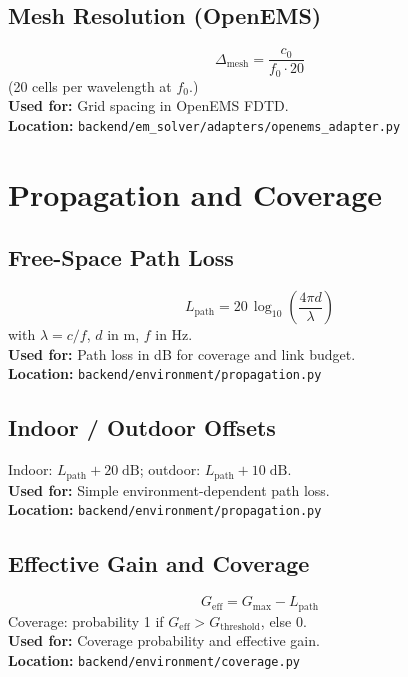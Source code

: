 \documentclass[11pt,a4paper]{article}
\begin{document}
\subsection{Mesh Resolution (OpenEMS)}
\begin{equation}
\Delta_{\mathrm{mesh}} = \frac{c_0}{f_0 \cdot 20}
\end{equation}
(20 cells per wavelength at \(f_0\).) \\
\textbf{Used for:} Grid spacing in OpenEMS FDTD. \\
\textbf{Location:} \texttt{backend/em\_solver/adapters/openems\_adapter.py}

\section{Propagation and Coverage}

\subsection{Free-Space Path Loss}
\begin{equation}
L_{\mathrm{path}} = 20\,\log_{10}\left(\frac{4\pi d}{\lambda}\right)
\end{equation}
with \(\lambda = c / f\), \(d\) in m, \(f\) in Hz. \\
\textbf{Used for:} Path loss in dB for coverage and link budget. \\
\textbf{Location:} \texttt{backend/environment/propagation.py}

\subsection{Indoor / Outdoor Offsets}
Indoor: \(L_{\mathrm{path}} + 20\;\mathrm{dB}\); outdoor: \(L_{\mathrm{path}} + 10\;\mathrm{dB}\). \\
\textbf{Used for:} Simple environment-dependent path loss. \\
\textbf{Location:} \texttt{backend/environment/propagation.py}

\subsection{Effective Gain and Coverage}
\begin{equation}
G_{\mathrm{eff}} = G_{\max} - L_{\mathrm{path}}
\end{equation}
Coverage: probability 1 if \(G_{\mathrm{eff}} > G_{\mathrm{threshold}}\), else 0. \\
\textbf{Used for:} Coverage probability and effective gain. \\
\textbf{Location:} \texttt{backend/environment/coverage.py}
\end{document}
